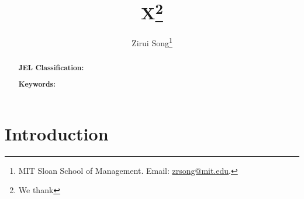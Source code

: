 \documentclass[letter,12pt]{article}
\title{X\thanks{We thank}}
\author{Zirui Song\footnote{MIT Sloan School of Management. Email: \href{mailto:zrsong@mit.edu}{zrsong@mit.edu}.}\\
        }
\begin{document}
\maketitle

\onehalfspacing  %

\begin{abstract}


\medskip
\noindent
\textbf{JEL Classification:}  %

\noindent
\textbf{Keywords:} 
\end{abstract}

\newpage 
\doublespacing
\section{Introduction}
\end{document}
